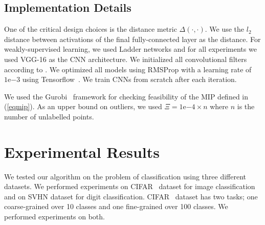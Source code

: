 \documentclass{article} %
\begin{document}
\subsection{Implementation Details} \label{sec:imp} One of the critical design choices is the distance metric
$\Delta(\cdot,\cdot)$. We use the $l_2$ distance between activations of the final fully-connected layer as the distance.
For weakly-supervised learning, we used Ladder networks \citep{ladder} and for all experiments we used VGG-16 \citep{vgg}
as the CNN architecture. We initialized all convolutional filters according to \citet{he_et_al}. We optimized all models using RMSProp with a learning rate of $1\mathrm{e}{-3}$ using
Tensorflow~\citep{tensorflow}. We train CNNs from scratch after each iteration. %

We used the Gurobi~\citep{gurobi} framework for checking feasibility of the MIP defined in (\ref{eqmip}). As an upper bound on outliers, we used $\Xi=1\mathrm{e}{-4} \times n$ where $n$ is the
number of unlabelled points.


\section{Experimental Results} \label{sec:exp} We tested our algorithm on the problem of classification using three
different datasets. We performed experiments on CIFAR~\citep{cifar} dataset for
image classification and on SVHN\citep{svhn} dataset for digit classification. CIFAR~\citep{cifar} dataset has two
tasks; one coarse-grained over 10 classes and one fine-grained over 100 classes. We performed experiments on both.
\end{document}
